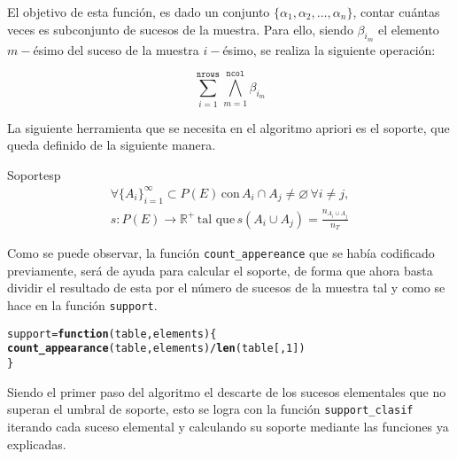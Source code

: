\documentclass[12pt]{report}\usepackage[]{graphicx}\usepackage[dvipsnames]{xcolor}
\makeatletter
\newcommand{\hlnum}[1]{\textcolor[rgb]{0.686,0.059,0.569}{#1}}%
\newcommand{\hlopt}[1]{\textcolor[rgb]{0,0,0}{#1}}%
\newcommand{\hlstd}[1]{\textcolor[rgb]{0.345,0.345,0.345}{#1}}%
\newcommand{\hlkwa}[1]{\textcolor[rgb]{0.161,0.373,0.58}{\textbf{#1}}}%
\newcommand{\hlkwb}[1]{\textcolor[rgb]{0.69,0.353,0.396}{#1}}%
\newcommand{\hlkwc}[1]{\textcolor[rgb]{0.333,0.667,0.333}{#1}}%
\newcommand{\hlkwd}[1]{\textcolor[rgb]{0.737,0.353,0.396}{\textbf{#1}}}%
\newenvironment{kframe}{%
 \def\at@end@of@kframe{}%
 \ifinner\ifhmode%
  \def\at@end@of@kframe{\end{minipage}}%
  \begin{minipage}{\columnwidth}%
 \fi\fi%
 \def\FrameCommand##1{\hskip\@totalleftmargin \hskip-\fboxsep
 \colorbox{shadecolor}{##1}\hskip-\fboxsep
     \hskip-\linewidth \hskip-\@totalleftmargin \hskip\columnwidth}%
 \MakeFramed {\advance\hsize-\width
   \@totalleftmargin\z@ \linewidth\hsize
   \@setminipage}}%
 {\par\unskip\endMakeFramed%
 \at@end@of@kframe}
\newenvironment{knitrout}{}{} %
\makeatother
\begin{document}
			El objetivo de esta función, es dado un conjunto $\{\alpha_1, \alpha_2, \ldots, \alpha_n\}$, contar cuántas veces es subconjunto de sucesos de la muestra. Para ello, siendo $\beta_{i_m}$ el elemento $m-$ésimo del suceso de la muestra $i-$ésimo, se realiza la siguiente operación: 
			
			$$
			\sum_{i=1}^\texttt{nrows}\bigwedge_{m=1}^\texttt{ncol}\beta_{i_m}
			$$
			
			La siguiente herramienta que se necesita en el algoritmo apriori es el soporte, que queda definido de la siguiente manera. 
			
			\begin{definicion}{Soporte}{sp}
				\begin{equation*}
					\begin{gathered}
						\forall\{A_i\}_{i=1}^\infty \subset P(E) \, \text{con} \, A_i \cap A_j \neq \varnothing \, \forall i \neq j, \\
						s: P(E) \longrightarrow \mathbb{R}^+ \, \text{tal que} \, s(A_i \cup A_j) = \frac{n_{A_i \cup A_j}}{n_T}
					\end{gathered}
				\end{equation*}
			\end{definicion}
			
			Como se puede observar, la función \texttt{count\_appereance} que se había codificado previamente, será de ayuda para calcular el soporte, de forma que ahora basta dividir el resultado de esta por el número de sucesos de la muestra tal y como se hace en la función \texttt{support}. 
			
\begin{knitrout}
\color{fgcolor}\begin{kframe}
\begin{alltt}
\hlstd{support} \hlkwb{=} \hlkwa{function}\hlstd{(}\hlkwc{table}\hlstd{,} \hlkwc{elements}\hlstd{) \{}
        \hlkwd{count_appearance}\hlstd{(table, elements)} \hlopt{/} \hlkwd{len}\hlstd{(table[,}\hlnum{1}\hlstd{])}
\hlstd{\}}
\end{alltt}
\end{kframe}
\end{knitrout}
			
			Siendo el primer paso del algoritmo el descarte de los sucesos elementales que no superan el umbral de soporte, esto se logra con la función \texttt{support\_clasif} iterando cada suceso elemental y calculando su soporte mediante las funciones ya explicadas. 
			
\end{document}
